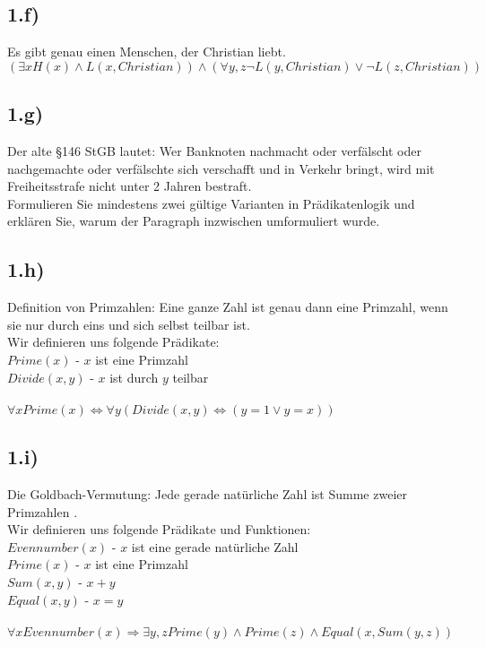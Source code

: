 \documentclass[a4paper]{article}
\begin{document}
\subsection*{1.f)}
Es gibt genau einen Menschen, der Christian liebt. \\
$(\exists x H(x) \land L(x,Christian)) \land (\forall y,z \neg L(y,Christian) \lor \neg L(z,Christian))$

\subsection*{1.g)}
Der alte \S 146 StGB lautet: \glqq Wer Banknoten nachmacht oder verf\"alscht oder nachgemachte oder verf\"alschte sich verschafft und in Verkehr bringt, wird mit Freiheitsstrafe nicht unter 2 Jahren bestraft.\grqq \\
Formulieren Sie mindestens zwei g\"ultige Varianten in Pr\"adikatenlogik und erkl\"aren Sie, warum der Paragraph inzwischen umformuliert wurde. \\


\subsection*{1.h)}
Definition von Primzahlen: \glqq Eine ganze Zahl ist genau dann eine Primzahl, wenn sie nur durch eins und sich selbst teilbar ist.\grqq \\
Wir definieren uns folgende Pr\"adikate:\\
$Prime(x)$ - $x$ ist eine Primzahl \\
$Divide(x,y)$ - $x$ ist durch $y$ teilbar \\
\\
$\forall x Prime(x) \Leftrightarrow \forall y (Divide(x,y) \Leftrightarrow (y=1 \lor y=x))$

\subsection*{1.i)}
Die Goldbach-Vermutung: \glqq Jede gerade nat\"urliche Zahl ist Summe zweier Primzahlen \grqq . \\
Wir definieren uns folgende Pr\"adikate und Funktionen: \\
$Evennumber(x)$ - $x$ ist eine gerade nat\"urliche Zahl \\
$Prime(x)$ - $x$ ist eine Primzahl \\
$Sum(x,y)$ - $x + y$ \\
$Equal(x,y)$ - $x = y$ \\
\\
$\forall x Evennumber(x) \Rightarrow \exists y,z Prime(y) \land Prime(z) \land Equal(x,Sum(y,z))$ 
\end{document}

